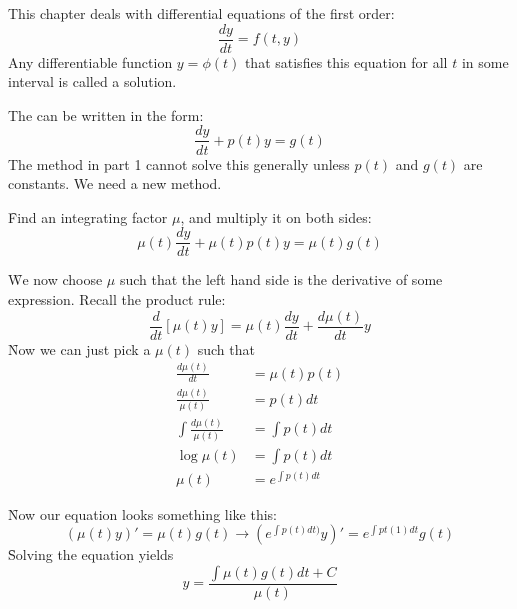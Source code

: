 This chapter deals with differential equations of the first order:
\begin{equation}
\frac{dy}{dt} = f(t,y)
\end{equation}
Any differentiable function $y = \phi(t)$ that satisfies this equation for all $t$ in some interval is called a solution.

The  can be written in the form:
\begin{equation}
\frac{dy}{dt} + p(t)y = g(t)
\end{equation}
The method in part 1 cannot solve this generally unless $p(t)$ and $g(t)$ are constants. We need a new method.
\begin{itemize}
\f Find an integrating factor $\mu$, and multiply it on both sides: 
	$$\mu(t)\frac{dy}{dt} + \mu(t)p(t)y = \mu(t)g(t)$$
	
\f We now choose $\mu$ such that the left hand side is the derivative of some expression. Recall the product rule:
	$$\frac{d}{dt}\left[\mu(t)y\right] = \mu(t)\frac{dy}{dt} + \frac{d\mu(t)}{dt}y$$
\f Now we can just pick a $\mu(t)$ such that 
	\begin{align*} 
		\frac{d\mu(t)}{dt} &= \mu(t)p(t)\\
		\frac{d\mu(t)}{\mu(t)} &= p(t)dt\\
		\int \! \frac{d\mu(t)}{\mu(t)} &= \int \! p(t)dt\\
		\log{\mu(t)} &= \int \! p(t)dt\\
		\mu(t) &= e^{\int \! p(t)dt}
	\end{align*}

\f Now our equation looks something like this:
$$(\mu(t)y)' = \mu(t)g(t) \rightarrow (e^{\int \! p(t)dt)}y)' = e^{\int \! pt(1)dt}g(t) $$
\f Solving the equation yields 
$$y = \frac{\int \! \mu(t)g(t)dt + C}{\mu(t)}$$
\end{itemize}

